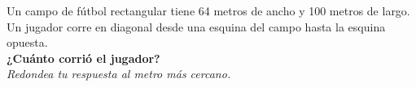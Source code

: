 Un campo de fútbol rectangular tiene 64 metros de ancho y 100 metros de largo.
Un jugador corre en diagonal desde una esquina del campo hasta la esquina opuesta.\\
\textbf{¿Cuánto corrió el jugador?}\\
\textit{Redondea tu respuesta al metro más cercano.}